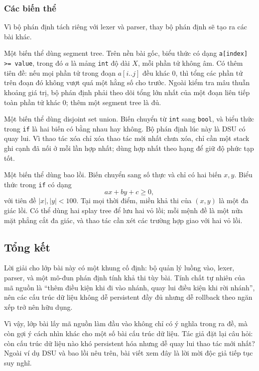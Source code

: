 \documentclass[11pt]{article}
\begin{document}
\subsubsection{Các biến thể}

Vì bộ phán định tách riêng với lexer và parser, thay bộ phán định sẽ tạo ra các
bài khác.

Một biến thể dùng segment tree. Trên nền bài gốc, biểu thức có dạng
\texttt{a[index] >= value}, trong đó \(a\) là mảng \texttt{int} độ dài \(X\),
mỗi phần tử không âm. Có thêm tiên đề: nếu mọi phần tử trong đoạn \(a[i..j]\)
đều khác \(0\), thì tổng các phần tử trên đoạn đó không vượt quá một hằng số
cho trước. Ngoài kiểm tra mâu thuẫn khoảng giá trị, bộ phán định phải theo dõi
tổng lớn nhất của một đoạn liên tiếp toàn phần tử khác \(0\); thêm một segment
tree là đủ.

Một biến thể dùng disjoint set union. Biến chuyển từ \texttt{int} sang
\texttt{bool}, và biểu thức trong \texttt{if} là hai biến có bằng nhau hay
không. Bộ phán định lúc này là DSU có quay lui. Vì thao tác xóa chỉ xóa thao
tác mới nhất chưa xóa, chỉ cần một stack ghi cạnh đã nối ở mỗi lần hợp nhất;
dùng hợp nhất theo hạng để giữ độ phức tạp tốt.

Một biến thể dùng bao lồi. Biến chuyển sang số thực và chỉ có hai biến \(x,y\).
Biểu thức trong \texttt{if} có dạng
\[
  ax+by+c\ge 0,
\]
với tiên đề \(|x|,|y|<100\). Tại mọi thời điểm, miền khả thi của \((x,y)\) là
một đa giác lồi. Có thể dùng hai splay tree để lưu hai vỏ lồi; mỗi mệnh đề là
một nửa mặt phẳng cắt đa giác, và thao tác cần xét các trường hợp giao với hai
vỏ lồi.

\subsection{Tổng kết}

Lời giải cho lớp bài này có một khung cố định: bộ quản lý luồng vào, lexer,
parser, và một mô-đun phán định tính khả thi tùy bài. Tính chất tự nhiên của mã
nguồn là ``thêm điều kiện khi đi vào nhánh, quay lui điều kiện khi rời nhánh'',
nên các cấu trúc dữ liệu không dễ persistent đầy đủ nhưng dễ rollback theo
ngăn xếp trở nên hữu dụng.

Vì vậy, lớp bài lấy mã nguồn làm đầu vào không chỉ có ý nghĩa trong ra đề, mà
còn gợi ý cách nhìn khác cho một số bài cấu trúc dữ liệu. Tác giả đặt lại câu
hỏi: còn cấu trúc dữ liệu nào khó persistent hóa nhưng dễ quay lui thao tác
mới nhất? Ngoài ví dụ DSU và bao lồi nêu trên, bài viết xem đây là lời mời độc
giả tiếp tục suy nghĩ.
\end{document}

